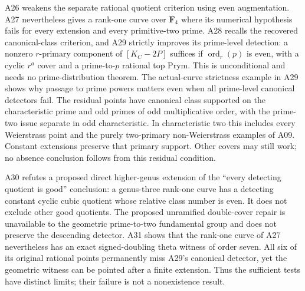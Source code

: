 A26 weakens the separate rational quotient criterion using even
augmentation. A27 nevertheless gives a rank-one curve over $\mathbf F_4$
where its numerical hypothesis fails for every extension and every
primitive-two prime. A28 recalls the recovered canonical-class criterion,
and A29 strictly improves its prime-level detection: a nonzero
$r$-primary component of $[K_C-2P]$ suffices if
$\operatorname{ord}_r(p)$ is even, with a cyclic $r^a$ cover and a
prime-to-$p$ rational top Prym. This is unconditional and needs no
prime-distribution theorem. The actual-curve strictness example in A29
shows why passage to prime powers matters even when all prime-level
canonical detectors fail. The residual points have canonical class
supported on the characteristic prime and odd primes of odd
multiplicative order, with the prime-two issue separate in odd
characteristic. In characteristic two this includes every Weierstrass
point and the purely two-primary non-Weierstrass examples of A09.
Constant extensions preserve that primary support. Other covers may
still work; no absence conclusion follows from this residual condition.

A30 refutes a proposed direct higher-genus extension of the
``every detecting quotient is good'' conclusion: a genus-three
rank-one curve has a detecting constant cyclic cubic quotient whose
relative class number is even. It does not exclude other good
quotients. The proposed unramified double-cover repair is unavailable
to the geometric prime-to-two fundamental group and does not preserve
the descending detector. A31 shows that the rank-one curve of A27
nevertheless has an exact signed-doubling theta witness of order seven.
All six of its original rational points permanently miss A29's
canonical detector, yet the geometric witness can be pointed after
a finite extension. Thus the sufficient tests have distinct limits;
their failure is not a nonexistence result.

